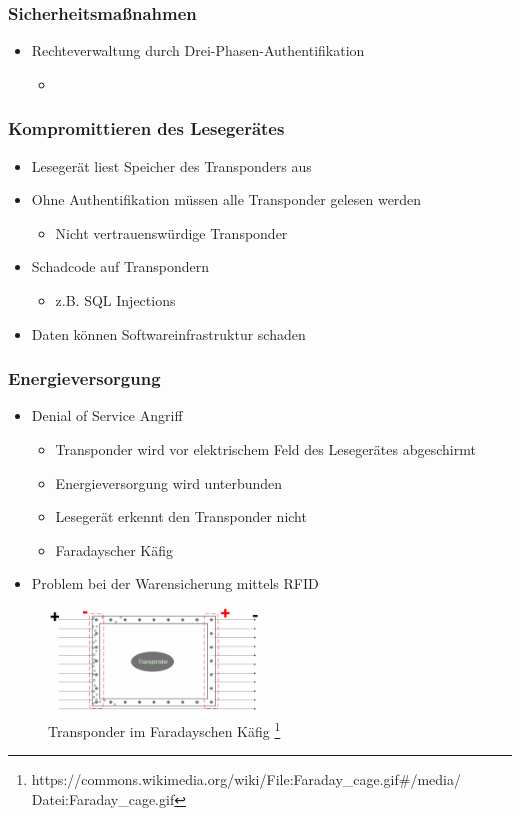 \documentclass{beamer}
\begin{document}
\begin{frame}
\frametitle{Sicherheitsmaßnahmen}

\begin{itemize}
	\item Rechteverwaltung durch Drei-Phasen-Authentifikation
	\begin{itemize}
		\item 
	\end{itemize}
\end{itemize}
\end{frame}


\begin{frame}
\frametitle{Kompromittieren des Lesegerätes}

\begin{itemize}
	\item Lesegerät liest Speicher des Transponders aus
	\item Ohne Authentifikation müssen alle Transponder gelesen werden
	\begin{itemize}
		\item Nicht vertrauenswürdige Transponder
	\end{itemize}
	\item Schadcode auf Transpondern
	\begin{itemize}
		\item z.B. SQL Injections
	\end{itemize}
	\item Daten können Softwareinfrastruktur schaden
\end{itemize}
\end{frame}


\begin{frame}
\frametitle{Energieversorgung}

\begin{itemize}
	\item Denial of Service Angriff
	\begin{itemize}
		\item Transponder wird vor elektrischem Feld des Lesegerätes abgeschirmt
		\item Energieversorgung wird unterbunden
		\item Lesegerät erkennt den Transponder nicht
		\item Faradayscher Käfig
	\end{itemize}
	
	\item Problem bei der Warensicherung mittels RFID
\end{itemize}

\begin{figure}
\includegraphics[width=0.5\textwidth]{img/kaefig.png}
\caption{Transponder im Faradayschen Käfig \footnote{https://commons.wikimedia.org/wiki/File:Faraday\_cage.gif\#/media/ Datei:Faraday\_cage.gif}}
\end{figure}
\end{frame}
\end{document}

